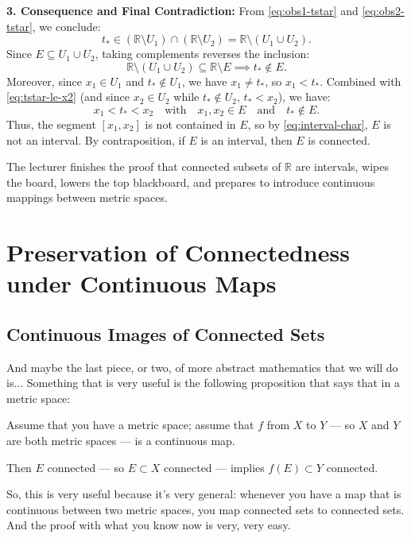 \begin{proofWrapper}
\begin{content}
\textbf{3. Consequence and Final Contradiction:}
From \eqref{eq:obs1-tstar} and \eqref{eq:obs2-tstar}, we conclude:
\begin{equation}\label{eq:tstar-not-in-union}
t_* \in (\mathbb{R} \setminus U_1) \cap (\mathbb{R} \setminus U_2) = \mathbb{R} \setminus (U_1 \cup U_2).
\end{equation}
Since $E \subseteq U_1 \cup U_2$, taking complements reverses the inclusion:
\begin{equation}\label{eq:tstar-not-in-e}
\mathbb{R} \setminus (U_1 \cup U_2) \subseteq \mathbb{R} \setminus E \implies t_* \notin E.
\end{equation}
Moreover, since $x_1 \in U_1$ and $t_* \notin U_1$, we have $x_1 \neq t_*$, so $x_1 < t_*$. Combined with \eqref{eq:tstar-le-x2} (and since $x_2 \in U_2$ while $t_* \notin U_2$, $t_* < x_2$), we have:
\[
x_1 < t_* < x_2 \quad \text{with} \quad x_1, x_2 \in E \quad \text{and} \quad t_* \notin E.
\]
Thus, the segment $[x_1, x_2]$ is not contained in $E$, so by \eqref{eq:interval-char}, $E$ is not an interval.
By contraposition, if $E$ is an interval, then $E$ is connected.
\end{content}

\end{proofWrapper}

\begin{note}
The lecturer finishes the proof that connected subsets of $\mathbb{R}$ are intervals, wipes the board, lowers the top blackboard, and prepares to introduce continuous mappings between metric spaces.
\end{note}

\section{Preservation of Connectedness under Continuous Maps}

\subsection{Continuous Images of Connected Sets}

\begin{speech}[00:21:18 - 00:22:35]
And maybe the last piece, or two, of more abstract mathematics that we will do is... Something that is very useful is the following proposition that says that in a metric space:

Assume that you have a metric space; assume that $f$ from $X$ to $Y$ --- so $X$ and $Y$ are both metric spaces --- is a continuous map.

Then $E$ connected --- so $E \subset X$ connected --- implies $f(E) \subset Y$ connected.

So, this is very useful because it's very general: whenever you have a map that is continuous between two metric spaces, you map connected sets to connected sets. And the proof with what you know now is very, very easy.
\end{speech}

